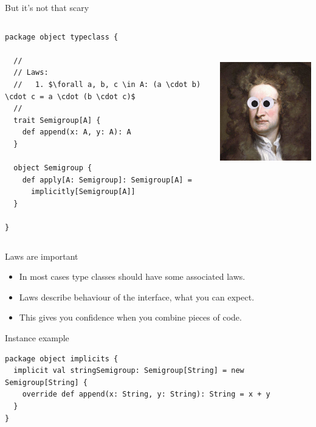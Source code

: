 \documentclass[presentation,aspectratio=169,smaller]{beamer}
\begin{document}
\begin{frame}[label={sec:orgd0c8221},fragile]{But it’s not that scary}
 \begin{columns}
\begin{column}{0.5\columnwidth}
\begin{verbatim}
package object typeclass {

  //
  // Laws:
  //   1. $\forall a, b, c \in A: (a \cdot b) \cdot c = a \cdot (b \cdot c)$
  //
  trait Semigroup[A] {
    def append(x: A, y: A): A
  }

  object Semigroup {
    def apply[A: Semigroup]: Semigroup[A] =
      implicitly[Semigroup[A]]
  }

}
\end{verbatim}
\end{column}

\begin{column}{0.5\columnwidth}
\begin{center}
\includegraphics[height=7cm]{images/scary.png}
\end{center}
\end{column}
\end{columns}
\end{frame}

\begin{frame}[label={sec:orge0108df}]{Laws are important}
\begin{itemize}
\item In most cases type classes should have some associated laws.
\item Laws describe behaviour of the interface, what you can expect.
\item This gives you confidence when you combine pieces of code.
\end{itemize}
\end{frame}

\begin{frame}[label={sec:org2c3e81b},fragile]{Instance example}
 \begin{verbatim}
package object implicits {
  implicit val stringSemigroup: Semigroup[String] = new Semigroup[String] {
    override def append(x: String, y: String): String = x + y
  }
}
\end{verbatim}
\end{frame}
\end{document}
